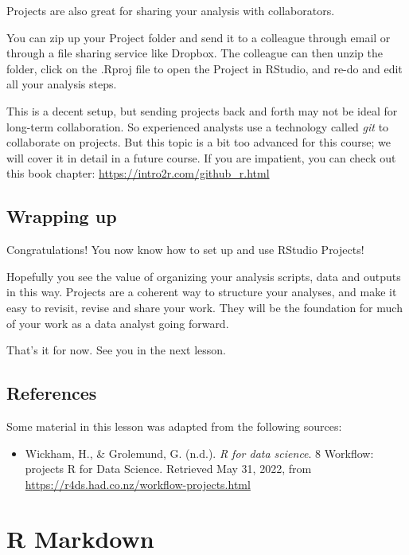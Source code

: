 \documentclass[
  letterpaper,
  DIV=11,
  numbers=noendperiod]{scrreprt}
\providecommand{\tightlist}{%
  \setlength{\itemsep}{0pt}\setlength{\parskip}{0pt}}\usepackage{longtable,booktabs,array}
\begin{document}
Projects are also great for sharing your analysis with collaborators.

You can zip up your Project folder and send it to a colleague through
email or through a file sharing service like Dropbox. The colleague can
then unzip the folder, click on the .Rproj file to open the Project in
RStudio, and re-do and edit all your analysis steps.

This is a decent setup, but sending projects back and forth may not be
ideal for long-term collaboration. So experienced analysts use a
technology called \emph{git} to collaborate on projects. But this topic
is a bit too advanced for this course; we will cover it in detail in a
future course. If you are impatient, you can check out this book
chapter: \url{https://intro2r.com/github_r.html}

\section{Wrapping up}\label{wrapping-up-3}

Congratulations! You now know how to set up and use RStudio Projects!

Hopefully you see the value of organizing your analysis scripts, data
and outputs in this way. Projects are a coherent way to structure your
analyses, and make it easy to revisit, revise and share your work. They
will be the foundation for much of your work as a data analyst going
forward.

That's it for now. See you in the next lesson.

\section*{References}\label{references-4}


Some material in this lesson was adapted from the following sources:

\begin{itemize}
\tightlist
\item
  Wickham, H., \& Grolemund, G. (n.d.). \emph{R for data science}. 8
  Workflow: projects \textbar{} R for Data Science. Retrieved May 31,
  2022, from \url{https://r4ds.had.co.nz/workflow-projects.html}
\end{itemize}

\chapter{R Markdown}\label{r-markdown}
\end{document}

